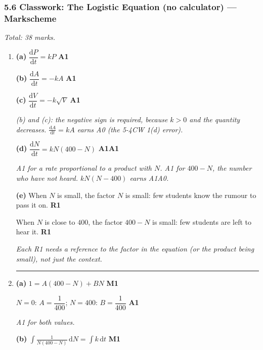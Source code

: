 \documentclass[12pt, twoside]{article}
\begin{document}
\subsubsection*{5.6 Classwork: The Logistic Equation (no calculator) --- Markscheme}

\emph{Total: 38 marks.}

\begin{enumerate}[itemsep=0.3cm]

\item[1.] [Maximum mark: 7]

\textbf{(a)} $\dfrac{\mathrm{d}P}{\mathrm{d}t} = kP$ \hfill \textbf{A1}

\textbf{(b)} $\dfrac{\mathrm{d}A}{\mathrm{d}t} = -kA$ \hfill \textbf{A1}

\textbf{(c)} $\dfrac{\mathrm{d}V}{\mathrm{d}t} = -k\sqrt{V}$ \hfill \textbf{A1}

\emph{(b) and (c): the negative sign is required, because $k > 0$ and the
quantity decreases. $\frac{\mathrm{d}A}{\mathrm{d}t} = kA$ earns A0 (the
5-4CW 1(d) error).}

\textbf{(d)} $\dfrac{\mathrm{d}N}{\mathrm{d}t} = kN\left(400 - N\right)$
\hfill \textbf{A1A1}

\emph{A1 for a rate proportional to a product with $N$. A1 for
$400 - N$, the number who have not heard. $kN(N - 400)$ earns A1A0.}

\textbf{(e)} When $N$ is small, the factor $N$ is small: few students
know the rumour to pass it on. \hfill \textbf{R1}

When $N$ is close to $400$, the factor $400 - N$ is small: few students are
left to hear it. \hfill \textbf{R1}

\emph{Each R1 needs a reference to the factor in the equation (or the
product being small), not just the context.}

\bigskip \hrule \bigskip

\item[2.] [Maximum mark: 10]

\textbf{(a)} $1 = A(400 - N) + BN$ \hfill \textbf{M1}

$N = 0$: $A = \dfrac{1}{400}$; \quad $N = 400$: $B = \dfrac{1}{400}$ \hfill \textbf{A1}

\emph{A1 for both values.}

\textbf{(b)} $\displaystyle\int \frac{1}{N(400 - N)}\,\mathrm{d}N = \int k\,\mathrm{d}t$
\hfill \textbf{M1}


\end{enumerate}
\end{document}
